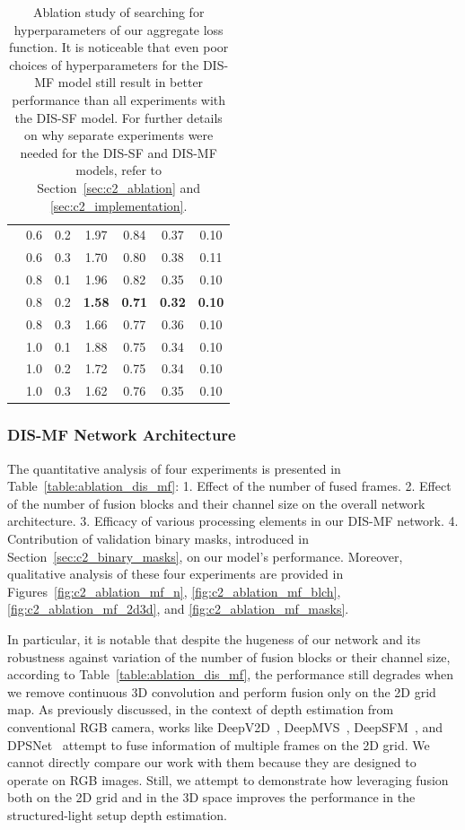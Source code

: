 \begin{table}[!t]
\begin{center}
\begin{tabular}{c|cc|cccc}
        & 0.6 & 0.2 & 1.97 & 0.84 & 0.37 & 0.10 \\
        & 0.6 & 0.3 & 1.70 & 0.80 & 0.38 & 0.11 \\
        & 0.8 & 0.1 & 1.96 & 0.82 & 0.35 & 0.10 \\
        & 0.8 & 0.2 & \textbf{1.58} & \textbf{0.71} & \textbf{0.32} & \textbf{0.10} \\
        & 0.8 & 0.3 & 1.66 & 0.77 & 0.36 & 0.10 \\
        & 1.0 & 0.1 & 1.88 & 0.75 & 0.34 & 0.10 \\
        & 1.0 & 0.2 & 1.72 & 0.75 & 0.34 & 0.10 \\
        & 1.0 & 0.3 & 1.62 & 0.76 & 0.35 & 0.10 \\
        \hline
        \end{tabular}
    \end{center}
    \caption{Ablation study of searching for hyperparameters of our aggregate loss function. It is noticeable that even poor choices of hyperparameters for the DIS-MF model still result in better performance than all experiments with the DIS-SF model. For further details on why separate experiments were needed for the DIS-SF and DIS-MF models, refer to Section~\ref{sec:c2_ablation} and \ref{sec:c2_implementation}.}
    \label{table:ablation_hyperparams}
\end{table}

\subsubsection{DIS-MF Network Architecture}
The quantitative analysis of four experiments is presented in Table~\ref{table:ablation_dis_mf}: 1. Effect of the number of fused frames. 2. Effect of the number of fusion blocks and their channel size on the overall network architecture. 3. Efficacy of various processing elements in our DIS-MF network. 4. Contribution of validation binary masks, introduced in Section~\ref{sec:c2_binary_masks}, on our model's performance. Moreover, qualitative analysis of these four experiments are provided in Figures~\ref{fig:c2_ablation_mf_n}, \ref{fig:c2_ablation_mf_blch}, \ref{fig:c2_ablation_mf_2d3d}, and \ref{fig:c2_ablation_mf_masks}.

In particular, it is notable that despite the hugeness of our network and its robustness against variation of the number of fusion blocks or their channel size, according to Table~\ref{table:ablation_dis_mf}, the performance still degrades when we remove continuous 3D convolution and perform fusion only on the 2D grid map. As previously discussed, in the context of depth estimation from conventional RGB camera, works like DeepV2D~\citep{teed2019deepv2d}, DeepMVS~\citep{huang2018deepmvs}, DeepSFM~\citep{wei2020deepsfm}, and DPSNet~\citep{im2018dpsnet} attempt to fuse information of multiple frames on the 2D grid. We cannot directly compare our work with them because they are designed to operate on RGB images. Still, we attempt to demonstrate how leveraging fusion both on the 2D grid and in the 3D space improves the performance in the structured-light setup depth estimation.


